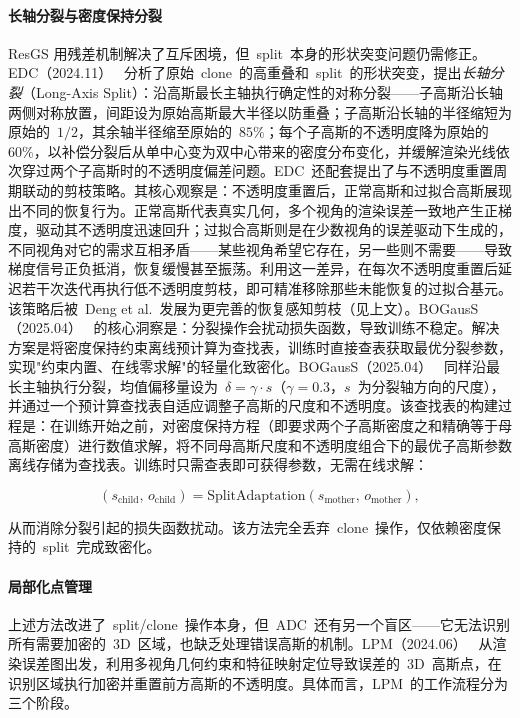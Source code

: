 \paragraph{长轴分裂与密度保持分裂}
ResGS 用残差机制解决了互斥困境，但~split~本身的形状突变问题仍需修正。EDC（2024.11）~\cite{2411_10133} 分析了原始~clone~的高重叠和~split~的形状突变，提出\emph{长轴分裂}（Long-Axis Split）：沿高斯最长主轴执行确定性的对称分裂——子高斯沿长轴两侧对称放置，间距设为原始高斯最大半径以防重叠；子高斯沿长轴的半径缩短为原始的~$1/2$，其余轴半径缩至原始的~$85\%$；每个子高斯的不透明度降为原始的~$60\%$，以补偿分裂后从单中心变为双中心带来的密度分布变化，并缓解渲染光线依次穿过两个子高斯时的不透明度偏差问题。EDC~还配套提出了与不透明度重置周期联动的剪枝策略。其核心观察是：不透明度重置后，正常高斯和过拟合高斯展现出不同的恢复行为。正常高斯代表真实几何，多个视角的渲染误差一致地产生正梯度，驱动其不透明度迅速回升；过拟合高斯则是在少数视角的误差驱动下生成的，不同视角对它的需求互相矛盾——某些视角希望它存在，另一些则不需要——导致梯度信号正负抵消，恢复缓慢甚至振荡。利用这一差异，在每次不透明度重置后延迟若干次迭代再执行低不透明度剪枝，即可精准移除那些未能恢复的过拟合基元。该策略后被~Deng et al.~发展为更完善的恢复感知剪枝（见上文）。BOGausS（2025.04）~\cite{2504_01844} 的核心洞察是：分裂操作会扰动损失函数，导致训练不稳定。解决方案是将密度保持约束离线预计算为查找表，训练时直接查表获取最优分裂参数，实现"约束内置、在线零求解"的轻量化致密化。BOGausS（2025.04）~\cite{2504_01844} 同样沿最长主轴执行分裂，均值偏移量设为~$\delta = \gamma \cdot s$（$\gamma = 0.3$，$s$~为分裂轴方向的尺度），并通过一个预计算查找表自适应调整子高斯的尺度和不透明度。该查找表的构建过程是：在训练开始之前，对密度保持方程（即要求两个子高斯密度之和精确等于母高斯密度）进行数值求解，将不同母高斯尺度和不透明度组合下的最优子高斯参数离线存储为查找表。训练时只需查表即可获得参数，无需在线求解：

\[
(s_{\text{child}},\, o_{\text{child}}) = \text{SplitAdaptation}(s_{\text{mother}},\, o_{\text{mother}}),
\]

从而消除分裂引起的损失函数扰动。该方法完全丢弃~clone~操作，仅依赖密度保持的~split~完成致密化。

\paragraph{局部化点管理}

上述方法改进了~split/clone~操作本身，但~ADC~还有另一个盲区——它无法识别所有需要加密的~3D~区域，也缺乏处理错误高斯的机制。LPM（2024.06）~\cite{2406_04251} 从渲染误差图出发，利用多视角几何约束和特征映射定位导致误差的~3D~高斯点，在识别区域执行加密并重置前方高斯的不透明度。具体而言，LPM~的工作流程分为三个阶段。

